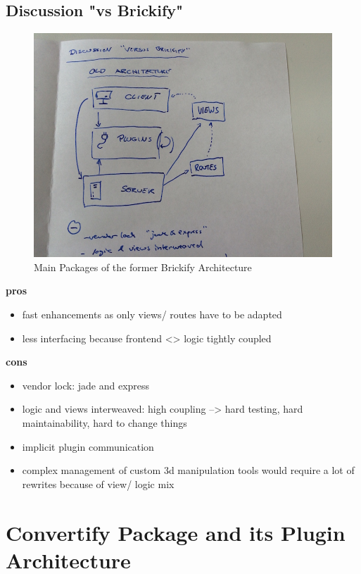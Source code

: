 \documentclass[../ClassicThesis.tex]{subfiles}
\begin{document}
\subsection{Discussion "vs Brickify"}

\begin{figure}
\label{fig:architecture_overview_brickify}
\includegraphics[width=1\columnwidth]{Images/03-architecture_overview_brickify.JPG}
\caption{Main Packages of the former Brickify Architecture}
\end{figure}

\textbf{pros}
\begin{itemize}
\item fast enhancements as only views/ routes have to be adapted
\item less interfacing because frontend <> logic tightly coupled
\end{itemize}

\textbf{cons}
\begin{itemize}
\item vendor lock: jade and express
\item logic and views interweaved: high coupling --> hard testing, hard maintainability, hard to change things
\item implicit plugin communication
\item complex management of custom 3d manipulation tools would require a lot of rewrites because of view/ logic mix
\end{itemize}




\section{Convertify Package and its Plugin Architecture}
\end{document}
